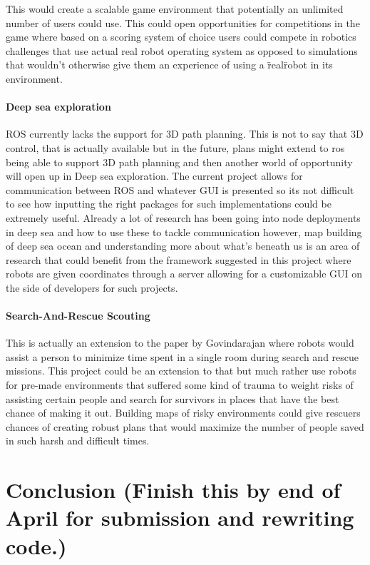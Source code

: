 \documentclass{report}
\begin{document}
        This would create a scalable game environment that potentially an unlimited number of users could use. This could open opportunities for competitions in the game where based on a scoring system of choice users could compete in robotics challenges that use actual real robot operating system as opposed to simulations that wouldn't otherwise give them an experience of using a \"real\" robot in its environment.
      
      \subsubsection{Deep sea exploration}
        ROS currently lacks the support for 3D path planning. This is not to say that 3D control, that is actually available but in the future, plans might extend to ros being able to support 3D path planning and then another world of opportunity will open up in Deep sea exploration. The current project allows for communication between ROS and whatever GUI is presented so its not difficult to see how inputting the right packages for such implementations could be extremely useful. Already a lot of research has been going into node deployments in deep sea and how to use these to tackle communication however, map building of deep sea ocean and understanding more about what's beneath us is an area of research that could benefit from the framework suggested in this project where robots are given coordinates through a server allowing for a customizable GUI on the side of developers for such projects.

      \subsubsection{Search-And-Rescue Scouting}
        This is actually an extension to the paper by Govindarajan\cite{Vijay} where robots would assist a person to minimize time spent in a single room during search and rescue missions. This project could be an extension to that but much rather use robots for pre-made environments that suffered some kind of trauma to weight risks of assisting certain people and search for survivors in places that have the best chance of making it out. Building maps of risky environments could give rescuers chances of creating robust plans that would maximize the number of people saved in such harsh and difficult times.

  \chapter{Conclusion (Finish this by end of April for submission and rewriting code.)}
\end{document}
